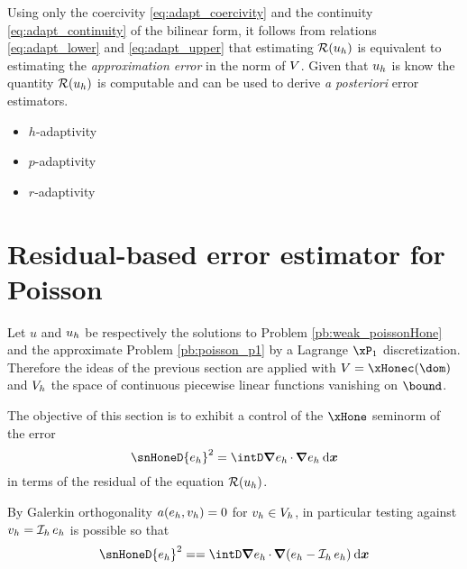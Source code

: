 Using only the coercivity \eqref{eq:adapt_coercivity} and the continuity \eqref{eq:adapt_continuity} of the bilinear form, it follows from relations \eqref{eq:adapt_lower} and \eqref{eq:adapt_upper} that estimating ${\mathcal{R}({u_h})}$ is equivalent to estimating the \textit{approximation error} in the norm of ${V}$.
Given that ${u_h}$ is know the quantity ${\mathcal{R}({u_h})}$ is computable and can be used to derive \textit{a posteriori} error estimators.



\begin{itemize}
\item $h$-adaptivity
\item $p$-adaptivity
\item $r$-adaptivity
\end{itemize}

\section{Residual-based error estimator for Poisson}

Let $u$ and ${u_h}$ be respectively the solutions to Problem \eqref{pb:weak_poissonHone} and the approximate Problem \eqref{pb:poisson_p1} by a Lagrange $\xPone$ discretization.
Therefore the ideas of the previous section are applied with $\xV = \xHonec(\dom)$ and ${{V}}_h$ the space of continuous piecewise linear functions vanishing on $\bound$.

\medskip
The objective of this section is to exhibit a control of the $\xHone$ seminorm of the error
\begin{equation*}
\snHoneD{e_h}^2 = \intD \Grad e_h \xDot \Grad e_h \dxx
\end{equation*}
in terms of the residual of the equation ${\mathcal{R}({u_h})}$.

\medskip
By Galerkin orthogonality $a(e_h, {v_h}) = 0$ for ${v_h} \in {{V}}_h$, in particular testing against ${v_h} = \mathop{\mathcal{I}_{h}} e_h$ is possible so that
\begin{equation*}
\snHoneD{e_h}^2 =  = \intD \Grad e_h \xDot \Grad (e_h - \Iop{h} e_h)\dxx
\end{equation*}

